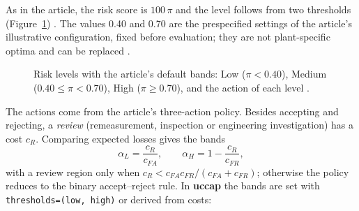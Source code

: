 \documentclass[a4paper,11pt,oneside,openany,parskip=half-,headings=standardclasses,toc=flat,numbers=noenddot]{scrbook}
\newcommand{\code}[1]{\texttt{\begingroup\def\_{\textunderscore\allowbreak}#1\endgroup}}
\newcommand{\pkg}{\textsf{\bfseries uccap}}
\newcommand{\figref}[1]{Figure~\ref{#1}}
\begin{document}
As in the article, the risk score is $100\,\pi$ and the level follows from two thresholds
(\figref{fig:levels}) \cite[Eq.~(22)]{jy-hybrid}. The values 0.40 and 0.70 are the prespecified settings of the
article's illustrative configuration, fixed before evaluation; they are not plant-specific optima and can be
replaced \cite[Sec.~5.3]{jy-hybrid}.

\begin{figure}[!htp]
\centering
{}
\caption{Risk levels with the article's default bands: Low ($\pi < 0.40$), Medium ($0.40 \le \pi < 0.70$), High
($\pi \ge 0.70$), and the action of each level \cite[Eq.~(26)]{jy-hybrid}.}\label{fig:levels}
\end{figure}

The actions come from the article's three-action policy. Besides accepting and rejecting, a \emph{review}
(remeasurement, inspection or engineering investigation) has a cost $c_R$. Comparing expected losses gives the
bands \cite[Eqs.~(23)--(26)]{jy-hybrid}
\[
\alpha_L = \frac{c_R}{c_{FA}}, \qquad \alpha_H = 1 - \frac{c_R}{c_{FR}},
\]
with a review region only when $c_R < c_{FA}c_{FR}/(c_{FA}+c_{FR})$; otherwise the policy reduces to the binary
accept--reject rule. In \pkg{} the bands are set with \code{thresholds=(low, high)} or derived from costs:
\end{document}
